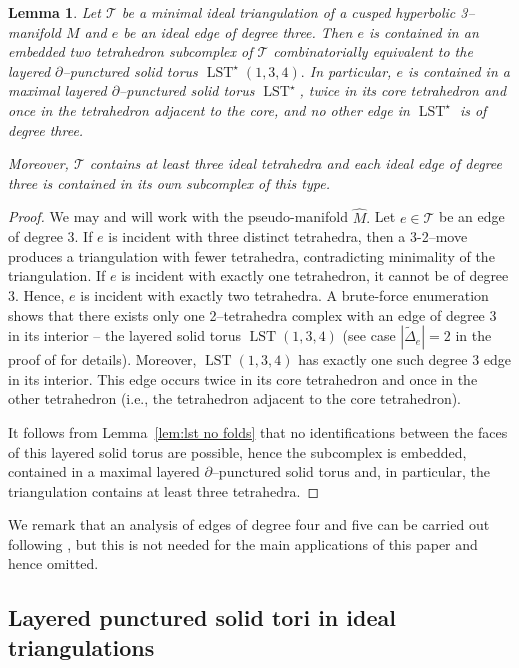 \documentclass[a4paper]{gtart}
\def\lst{\operatorname{LST}}
\def\tri{\mathcal{T}}
\def\manifold{M}
\theoremstyle{plain}
\newtheorem{lemma}[theorem]{Lemma}
\theoremstyle{definition}
\theoremstyle{remark}
\numberwithin{equation}{section}
\begin{document}
\begin{lemma}
  \label{lem:degreethree}
  Let $\tri$ be a minimal ideal triangulation of a cusped hyperbolic 3--manifold $\manifold$ and $e$ be an ideal edge of degree three. Then $e$ is contained in an embedded two tetrahedron subcomplex of $\tri$ combinatorially equivalent to the layered $\partial$--punctured solid torus $\lst^\star(1, 3, 4).$ 
In particular, $e$ is contained in a maximal layered $\partial$--punctured solid torus $\lst^\star$, twice in its core tetrahedron and once in the tetrahedron adjacent to the core, and no other edge in $\lst^\star$ is of degree three.

Moreover, $\tri$ contains at least three ideal tetrahedra and each ideal edge of degree three is contained in its own subcomplex of this type.
\end{lemma}

\begin{proof}
We may and will work with the pseudo-manifold $\widehat{\manifold}.$ Let $e \in \tri$ be an edge of degree $3.$ If $e$ is incident with three distinct tetrahedra, then a $3$-2--move produces a triangulation with fewer tetrahedra, contradicting minimality of the triangulation. If $e$ is incident with exactly one tetrahedron, it cannot be of degree $3.$ Hence, $e$ is incident with exactly two tetrahedra. A brute-force enumeration shows that there exists only one 2--tetrahedra complex with an edge of degree $3$ in its interior -- the layered solid torus $\lst(1,3,4)$ (see case $|\tilde{\Delta}_e|=2$ in the proof of \cite[Proposition 9]{Jaco-minimal-2009} for details). Moreover, $\lst(1,3,4)$ has exactly one such degree $3$ edge in its interior. This edge occurs twice in its core tetrahedron and once in the other tetrahedron (i.e., the tetrahedron adjacent to the core tetrahedron).

It follows from Lemma~\ref{lem:lst no folds} that no identifications between the faces of this layered solid torus are possible, hence the subcomplex is embedded, contained in a maximal layered $\partial$--punctured solid torus and, in particular, the triangulation contains at least three tetrahedra.
\end{proof}

We remark that an analysis of edges of degree four and five can be carried out following \cite{Jaco-minimal-2009}, but this is not needed for the main applications of this paper and hence omitted.


\subsection{Layered punctured solid tori in ideal triangulations}
\end{document}
